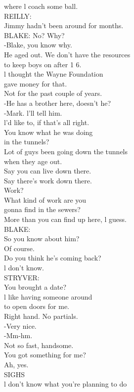 \documentclass{article}
\begin{document}
\begin{multicols}{3}
where l coach some ball.\\
REILLY:\\
Jimmy hadn't been around for months.\\
BLAKE: No? Why?\\
-Blake, you know why.\\
He aged out. We don't have the resources\\
to keep boys on after 1 6.\\
l thought the Wayne Foundation\\
gave money for that.\\
Not for the past couple of years.\\
-He has a brother here, doesn't he?\\
-Mark. l'll tell him.\\
l'd like to, if that's all right.\\
You know what he was doing\\
in the tunnels?\\
Lot of guys been going down the tunnels\\
when they age out.\\
Say you can live down there.\\
Say there's work down there.\\
Work?\\
What kind of work are you\\
gonna find in the sewers?\\
More than you can find up here, l guess.\\
BLAKE:\\
So you know about him?\\
Of course.\\
Do you think he's coming back?\\
l don't know.\\
STRYVER:\\
You brought a date?\\
l like having someone around\\
to open doors for me.\\
Right hand. No partials.\\
-Very nice.\\
-Mm-hm.\\
Not so fast, handsome.\\
You got something for me?\\
Ah, yes.\\
SIGHS\\
l don't know what you're planning to do\\

\end{multicols}
\end{document}
